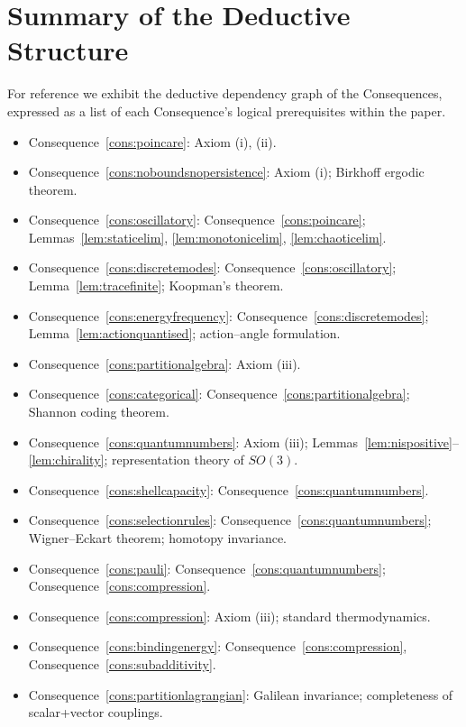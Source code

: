 \documentclass[11pt,twocolumn,a4paper]{article}
\theoremstyle{axiomstyle}
\theoremstyle{conseqstyle}
\theoremstyle{definition}
\theoremstyle{remark}
\begin{document}
\section{Summary of the Deductive Structure}
\label{app:deductive}

For reference we exhibit the deductive dependency graph of the Consequences, expressed as a list of each Consequence's logical prerequisites within the paper.

\begin{itemize}
\item Consequence~\ref{cons:poincare}: Axiom (i), (ii).
\item Consequence~\ref{cons:noboundsnopersistence}: Axiom (i); Birkhoff ergodic theorem.
\item Consequence~\ref{cons:oscillatory}: Consequence~\ref{cons:poincare}; Lemmas~\ref{lem:staticelim}, \ref{lem:monotonicelim}, \ref{lem:chaoticelim}.
\item Consequence~\ref{cons:discretemodes}: Consequence~\ref{cons:oscillatory}; Lemma~\ref{lem:tracefinite}; Koopman's theorem.
\item Consequence~\ref{cons:energyfrequency}: Consequence~\ref{cons:discretemodes}; Lemma~\ref{lem:actionquantised}; action--angle formulation.
\item Consequence~\ref{cons:partitionalgebra}: Axiom (iii).
\item Consequence~\ref{cons:categorical}: Consequence~\ref{cons:partitionalgebra}; Shannon coding theorem.
\item Consequence~\ref{cons:quantumnumbers}: Axiom (iii); Lemmas~\ref{lem:nispositive}--\ref{lem:chirality}; representation theory of $SO(3)$.
\item Consequence~\ref{cons:shellcapacity}: Consequence~\ref{cons:quantumnumbers}.
\item Consequence~\ref{cons:selectionrules}: Consequence~\ref{cons:quantumnumbers}; Wigner--Eckart theorem; homotopy invariance.
\item Consequence~\ref{cons:pauli}: Consequence~\ref{cons:quantumnumbers}; Consequence~\ref{cons:compression}.
\item Consequence~\ref{cons:compression}: Axiom (iii); standard thermodynamics.
\item Consequence~\ref{cons:bindingenergy}: Consequence~\ref{cons:compression}, Consequence~\ref{cons:subadditivity}.
\item Consequence~\ref{cons:partitionlagrangian}: Galilean invariance; completeness of scalar+vector couplings.

\end{itemize}
\end{document}
